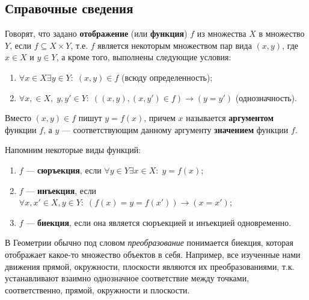 \setcounter{chapter}{58}

\subsection*{Справочные сведения}

Говорят, что задано \textbf{отображение} (или \textbf{функция}) $f$ из множества $X$ в множество $Y$, если $f\subseteq X\times Y$, т.е. $f$ является некоторым множеством пар вида $(x,y)$, где $x\in X$ и $y\in Y$, а кроме того, выполнены следующие условия:
\begin{enumerate}
\item $\forall x\in X\exists y\in Y:\;(x,y)\in f$ (всюду определенность);
\item $\forall x,\in X,\;y,y'\in Y:\;((x,y),(x,y')\in f)\to(y=y')$ (однозначность).
\end{enumerate}
Вместо $(x,y)\in f$ пишут $y=f(x)$, причем $x$ называется \textbf{аргументом} функции $f$, а $y$ --- соответствующим данному аргументу \textbf{значением} функции $f$.

Напомним некоторые виды функций:
\begin{enumerate}[resume*]
\item $f$ --- \textbf{сюръекция}, если $\forall y\in Y\exists x\in X:\;y=f(x)$;
\item $f$ --- \textbf{инъекция}, если $\forall x,x'\in X,y\in Y:\;(f(x)=y=f(x'))\to (x=x')$;
\item $f$ --- \textbf{биекция}, если она является сюръекцией и инъекцией одновременно.
\end{enumerate}

В Геометрии обычно под словом \textit{преобразование} понимается биекция,
которая отображает какое-то множество объектов в себя. Например, все 
изученные нами движения прямой, окружности, плоскости являются их преобразованиями,
 т.к. устанавливают взаимно однозначное соответствие между
точками, соответственно, прямой, окружности и плоскости.

